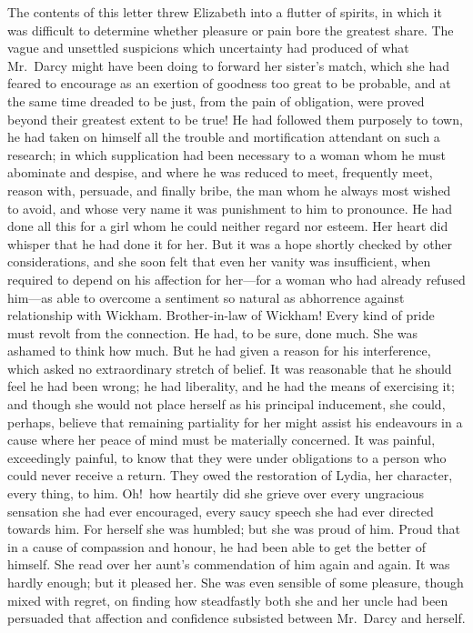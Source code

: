 \documentclass[12pt,english]{book}
\begin{document}
The contents of this letter threw Elizabeth into a flutter of spirits,
in which it was difficult to determine whether pleasure or pain bore
the greatest share. The vague and unsettled suspicions which uncertainty
had produced of what Mr.\ Darcy might have been doing to forward
her sister's match, which she had feared to encourage as an exertion
of goodness too great to be probable, and at the same time dreaded
to be just, from the pain of obligation, were proved beyond their
greatest extent to be true! He had followed them purposely to town,
he had taken on himself all the trouble and mortification attendant
on such a research; in which supplication had been necessary to a
woman whom he must abominate and despise, and where he was reduced
to meet, frequently meet, reason with, persuade, and finally bribe,
the man whom he always most wished to avoid, and whose very name it
was punishment to him to pronounce. He had done all this for a girl
whom he could neither regard nor esteem. Her heart did whisper that
he had done it for her. But it was a hope shortly checked by other
considerations, and she soon felt that even her vanity was insufficient,
when required to depend on his affection for her\mbox{---}for a woman
who had already refused him\mbox{---}as able to overcome a sentiment
so natural as abhorrence against relationship with Wickham. Brother-in-law
of Wickham! Every kind of pride must revolt from the connection. He
had, to be sure, done much. She was ashamed to think how much. But
he had given a reason for his interference, which asked no extraordinary
stretch of belief. It was reasonable that he should feel he had been
wrong; he had liberality, and he had the means of exercising it; and
though she would not place herself as his principal inducement, she
could, perhaps, believe that remaining partiality for her might assist
his endeavours in a cause where her peace of mind must be materially
concerned. It was painful, exceedingly painful, to know that they
were under obligations to a person who could never receive a return.
They owed the restoration of Lydia, her character, every thing, to
him. Oh!\ how heartily did she grieve over every ungracious sensation
she had ever encouraged, every saucy speech she had ever directed
towards him. For herself she was humbled; but she was proud of him.
Proud that in a cause of compassion and honour, he had been able to
get the better of himself. She read over her aunt's commendation of
him again and again. It was hardly enough; but it pleased her. She
was even sensible of some pleasure, though mixed with regret, on finding
how steadfastly both she and her uncle had been persuaded that affection
and confidence subsisted between Mr.\ Darcy and herself.
\end{document}
